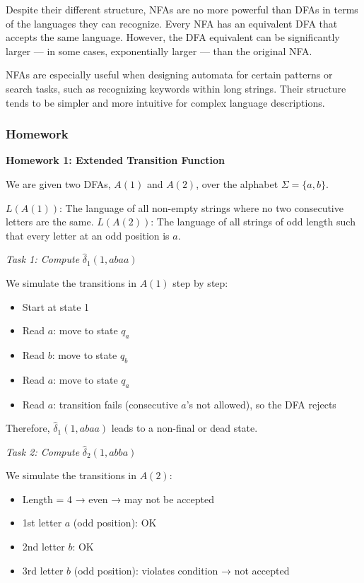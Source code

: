 \documentclass{article}
\theoremstyle{theorem}
\theoremstyle{definition}
\theoremstyle{remark}
\begin{document}
Despite their different structure, NFAs are no more powerful than DFAs in terms of the languages they can recognize. Every NFA has an equivalent DFA that accepts the same language. However, the DFA equivalent can be significantly larger — in some cases, exponentially larger — than the original NFA.

NFAs are especially useful when designing automata for certain patterns or search tasks, such as recognizing keywords within long strings. Their structure tends to be simpler and more intuitive for complex language descriptions.

\subsubsection{Homework}

\textbf{Homework 1: Extended Transition Function}

We are given two DFAs, $A(1)$ and $A(2)$, over the alphabet $\Sigma = \{a, b\}$.

$L(A(1))$: The language of all non-empty strings where no two consecutive letters are the same.  
$L(A(2))$: The language of all strings of odd length such that every letter at an odd position is $a$.

\textit{Task 1: Compute } $\hat{\delta}_1(1, abaa)$

We simulate the transitions in $A(1)$ step by step:

\begin{itemize}
  \item Start at state 1
  \item Read $a$: move to state $q_a$
  \item Read $b$: move to state $q_b$
  \item Read $a$: move to state $q_a$
  \item Read $a$: transition fails (consecutive $a$'s not allowed), so the DFA rejects
\end{itemize}

Therefore, $\hat{\delta}_1(1, abaa)$ leads to a non-final or dead state.

\textit{Task 2: Compute } $\hat{\delta}_2(1, abba)$

We simulate the transitions in $A(2)$:

\begin{itemize}
  \item Length = 4 → even → may not be accepted
  \item 1st letter $a$ (odd position): OK
  \item 2nd letter $b$: OK
  \item 3rd letter $b$ (odd position): violates condition → not accepted
\end{itemize}
\end{document}
